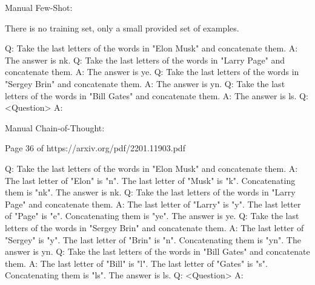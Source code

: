 \documentclass[11pt]{article}
\begin{document}
Manual Few-Shot:

There is no training set, only a small provided set of examples.

Q: Take the last letters of the words in "Elon Musk" and concatenate them.
A: The answer is nk.
Q: Take the last letters of the words in "Larry Page" and concatenate them.
A: The answer is ye.
Q: Take the last letters of the words in "Sergey Brin" and concatenate them.
A: The answer is yn.
Q: Take the last letters of the words in "Bill Gates" and concatenate them.
A: The answer is ls.
Q: <Question>
A: 

Manual Chain-of-Thought:

Page 36 of https://arxiv.org/pdf/2201.11903.pdf

Q: Take the last letters of the words in "Elon Musk" and concatenate them.
A: The last letter of "Elon" is "n". The last letter of "Musk" is "k". Concatenating them is "nk". The answer is nk.
Q: Take the last letters of the words in "Larry Page" and concatenate them.
A: The last letter of "Larry" is "y". The last letter of "Page" is "e". Concatenating them is "ye". The answer is ye.
Q: Take the last letters of the words in "Sergey Brin" and concatenate them.
A: The last letter of "Sergey" is "y". The last letter of "Brin" is "n". Concatenating them is "yn". The answer is yn.
Q: Take the last letters of the words in "Bill Gates" and concatenate them.
A: The last letter of "Bill" is "l". The last letter of "Gates" is "s". Concatenating them is "ls". The answer is ls.
Q: <Question>
A: 
\end{document}
